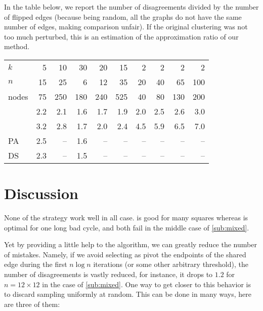 In the table below, we report the number of disagreements divided by the
number of flipped edges (because being random, all the graphs do not have the
same number of edges, making comparison unfair). If the original clustering
was not too much perturbed, this is an estimation of the approximation ratio
of our method.

\begin{center}
\begin{tabular}{lrrrrrrrrr}
\toprule
$k$      & 5   & 10  & 30  & 20  & 15  & 2   & 2   & 2   & 2  \\
$n$      & 15  & 25  & 6   & 12  & 35  & 20  & 40  & 65  & 100 \\
nodes    & 75  & 250 & 180 & 240 & 525 & 40  & 80  & 130 & 200 \\
\midrule
\pat{}   & 2.2 & 2.1 & 1.6 & 1.7 & 1.9 & 2.0 & 2.5 & 2.6 & 3.0 \\
\pot{}   & 3.2 & 2.8 & 1.7 & 2.0 & 2.4 & 4.5 & 5.9 & 6.5 & 7.0 \\
PA       & 2.5 & --  & 1.6 & --  & --  & --  & --  & --  & -- \\
DS       & 2.3 & --  & 1.5 & --  & --  & --  & --  & --  & -- \\
\bottomrule
\end{tabular}
\end{center}

\section{Discussion}

None of the strategy work well in all case. \pot{} is good for many squares
whereas \pat{} is optimal for one long bad cycle, and both fail in the middle
case of \autoref{sub:mixed}.

Yet by providing a little help to the algorithm, we can greatly reduce the
number of mistakes. Namely, if we avoid selecting as pivot the endpoints of
the shared edge during the first $n\log n$ iterations (or some other arbitrary
threshold), the number of disagreements is vastly reduced, for instance, it
drops to $1.2$ for $n=12\times 12$ in the case of \autoref{sub:mixed}.  One
way to get closer to this behavior is to discard sampling uniformly at random.
This can be done in many ways, here are three of them:

